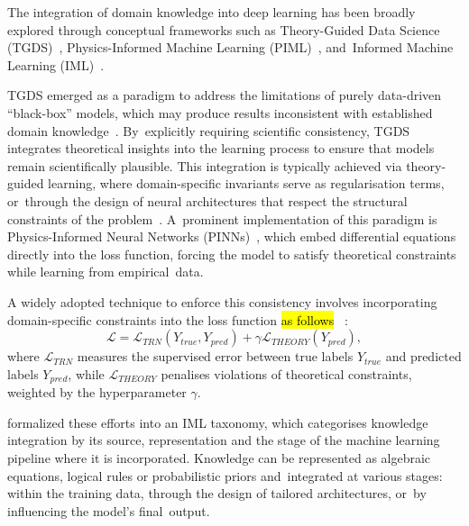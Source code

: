 \documentclass[applsci,article,accept,moreauthors,pdftex]{Definitions/mdpi}
\begin{document}
The integration of domain knowledge into deep learning has been broadly explored through conceptual frameworks such as Theory-Guided Data Science (TGDS)~\citep{karpatne2017theory}, Physics-Informed Machine Learning (PIML)~\citep{karniadakis2021physics}, and~Informed Machine Learning (IML)~\citep{vonrueden2021informed}. 


TGDS emerged as a paradigm to address the limitations of purely data-driven ``black-box'' models, which may produce results inconsistent with established domain knowledge~\citep{karpatne2017theory}. By~explicitly requiring scientific consistency, TGDS integrates theoretical insights into the learning process to ensure that models remain scientifically plausible. This integration is typically achieved via theory-guided learning, where domain-specific invariants serve as {regularisation} terms, or~through the design of neural architectures that respect the structural constraints of the problem~\citep{karpatne2017theory, jia2021physics}. A~prominent implementation of this paradigm is Physics-Informed Neural Networks (PINNs)~\citep{raissi2019physics, karniadakis2021physics}, which embed differential equations directly into the loss function, forcing the model to satisfy theoretical constraints while learning from empirical~data. 

A widely adopted technique to enforce this consistency involves incorporating domain-specific constraints into the loss function \hl{as follows}%
~\citep{karpatne2017theory, willard2022integrating}:
\begin{equation} \label{eq_theory_loss}
\mathcal{L} = \mathcal{L}_{TRN}(Y_{true}, Y_{pred}) + \gamma \mathcal{L}_{THEORY}(Y_{pred}),
\end{equation}
where $\mathcal{L}_{TRN}$ measures the supervised error between true labels $Y_{true}$ and predicted labels $Y_{pred}$, while $\mathcal{L}_{THEORY}$ {penalises} violations of theoretical constraints, weighted by the hyperparameter $\gamma$. 

\citet{vonrueden2021informed} formalized these efforts into an IML taxonomy, which {categorises} knowledge integration by its source, representation and the stage of the machine learning pipeline where it is incorporated. Knowledge can be represented as algebraic equations, logical rules or probabilistic priors and~integrated at various stages: within the training data, through the design of tailored architectures, or~by influencing the model's final~output. 
\end{document}

